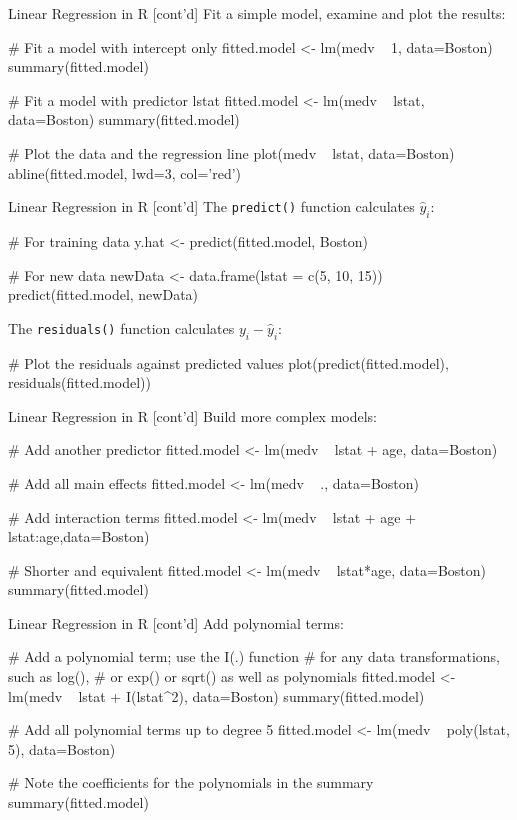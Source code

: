 \documentclass[ignorenonframetext,xcolor=x11names]{beamer}
\begin{document}
\begin{frame}[fragile]{Linear Regression in R \small [cont'd]}
\small
Fit a simple model, examine and plot the results:
\begin{Rcode}
# Fit a model with intercept only
fitted.model <- lm(medv ~ 1, data=Boston)
summary(fitted.model)

# Fit a model with predictor lstat
fitted.model <- lm(medv ~ lstat, data=Boston)
summary(fitted.model)

# Plot the data and the regression line
plot(medv ~ lstat, data=Boston)
abline(fitted.model, lwd=3, col='red')
\end{Rcode}
\end{frame}

\begin{frame}[fragile]{Linear Regression in R \small [cont'd]}
\small
The \texttt{predict()} function calculates $\hat{y}_i$:

\begin{Rcode}
# For training data
y.hat <- predict(fitted.model, Boston)

# For new data
newData <- data.frame(lstat = c(5, 10, 15))
predict(fitted.model, newData)
\end{Rcode}

The \texttt{residuals()} function calculates $y_i - \hat{y}_i$:
\begin{Rcode}
# Plot the residuals against predicted values
plot(predict(fitted.model), residuals(fitted.model))
\end{Rcode}
\end{frame}

\begin{frame}[fragile]{Linear Regression in R \small [cont'd]}
\small
Build more complex models:
\begin{Rcode}
# Add another predictor
fitted.model <- lm(medv ~ lstat + age, data=Boston)

# Add all main effects
fitted.model <- lm(medv ~ ., data=Boston)

# Add interaction terms
fitted.model <- lm(medv ~ lstat + age + lstat:age,data=Boston)
   
# Shorter and equivalent
fitted.model <- lm(medv ~ lstat*age, data=Boston)
summary(fitted.model)
\end{Rcode}
\end{frame}

\begin{frame}[fragile]{Linear Regression in R \small [cont'd]}
\small
Add polynomial terms:
\begin{Rcode}
# Add a polynomial term; use the I(.) function
# for any data transformations, such as log(),
# or exp() or sqrt() as well as polynomials
fitted.model <- lm(medv ~ lstat + I(lstat^2), data=Boston)
summary(fitted.model)

# Add all polynomial terms up to degree 5
fitted.model <- lm(medv ~ poly(lstat, 5), data=Boston)

# Note the coefficients for the polynomials in the summary
summary(fitted.model)
\end{Rcode}
\end{frame}
\end{document}
